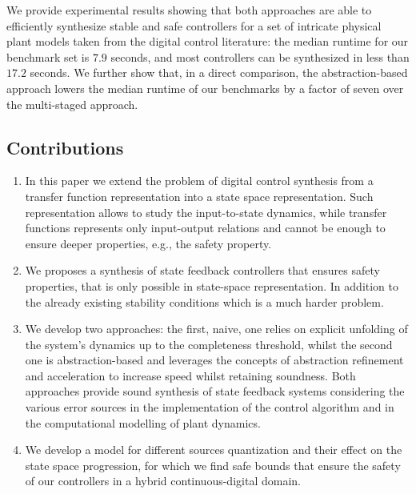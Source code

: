 \documentclass[runningheads,a4paper]{llncs}
\begin{document}

We provide experimental results 
showing that both approaches are able to efficiently synthesize stable and safe controllers 
for a set of intricate physical plant models taken from the digital 
control literature: the median runtime for our benchmark
set is $7.9$ seconds, and most controllers can be synthesized in less
than $17.2$ seconds. We further show that, in a direct comparison, the abstraction-based
approach lowers the median runtime of our benchmarks by a factor of seven over the
multi-staged approach.


\subsection*{Contributions} 

\begin{enumerate}
%
\item In this paper we extend the problem of digital control synthesis 
  from a transfer function representation into a state space representation. 
  Such representation allows to study the  input-to-state dynamics, while 
  transfer functions represents only input-output relations and cannot be 
  enough to ensure deeper properties, e.g., the safety property.
%
\item We proposes a synthesis of state feedback controllers that ensures 
  safety properties, that is only  possible in state-space representation. 
  In addition to the already existing stability conditions which is a much 
  harder problem.
%
\item We develop two approaches: the first, naive, one relies on
  explicit unfolding of the system's dynamics up to the completeness
  threshold, whilst the second one is abstraction-based and leverages
  the concepts of abstraction refinement and acceleration to increase 
  speed whilst retaining soundness. Both approaches provide sound
  synthesis of state feedback systems considering the various
  error sources in the implementation of the control algorithm and in the
  computational modelling of plant dynamics.
%
\item We develop a model for different sources quantization and their
  effect on the state space progression, for which we find safe bounds
  that ensure the safety of our controllers in a hybrid
  continuous-digital domain.
%
\end{enumerate}
\end{document}
